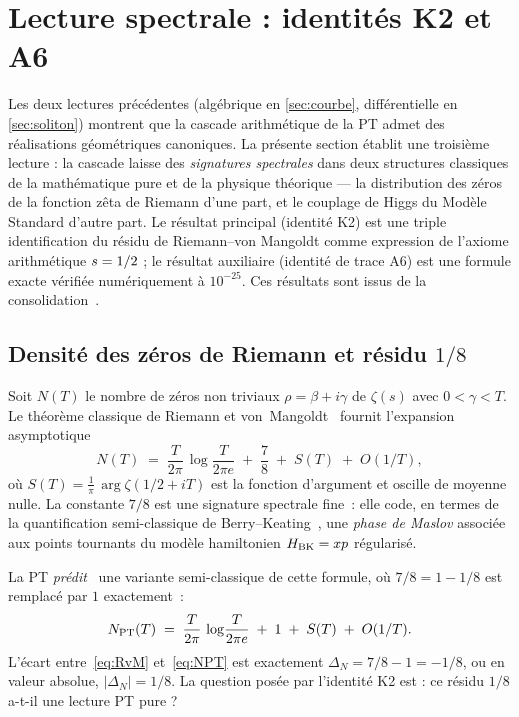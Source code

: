 \section{Lecture spectrale : identités K2 et A6}
\label{sec:spectrales}

Les deux lectures précédentes (algébrique en \ref{sec:courbe}, différentielle en \ref{sec:soliton}) montrent que la cascade arithmétique de la PT admet des réalisations géométriques canoniques. La présente section établit une troisième lecture : la cascade laisse des \emph{signatures spectrales} dans deux structures classiques de la mathématique pure et de la physique théorique --- la distribution des zéros de la fonction zêta de Riemann d'une part, et le couplage de Higgs du Modèle Standard d'autre part. Le résultat principal (identité K2) est une triple identification du résidu de Riemann--von Mangoldt comme expression de l'axiome arithmétique $s = 1/2$ ; le résultat auxiliaire (identité de trace A6) est une formule exacte vérifiée numériquement à $10^{-25}$. Ces résultats sont issus de la consolidation~\cite{PT_NewMath_Consolidation}.

\subsection{Densité des zéros de Riemann et résidu \texorpdfstring{$1/8$}{1/8}}
\label{sec:spectrales:RvM}

Soit $N(T)$ le nombre de zéros non triviaux $\rho = \beta + i\gamma$ de $\zeta(s)$ avec $0 < \gamma < T$. Le théorème classique de Riemann et von~Mangoldt~\cite{Edwards1974} fournit l'expansion asymptotique
\begin{equation}
N(T) \;=\; \dfrac{T}{2\pi}\,\log\!\dfrac{T}{2\pi e} \;+\; \dfrac{7}{8} \;+\; S(T) \;+\; O(1/T),
\label{eq:RvM}
\end{equation}
où $S(T) = \frac{1}{\pi}\,\arg \zeta(1/2 + iT)$ est la fonction d'argument et oscille de moyenne nulle. La constante $7/8$ est une signature spectrale fine~: elle code, en termes de la quantification semi-classique de Berry--Keating~\cite{BerryKeating1999}, une \emph{phase de Maslov} associée aux points tournants du modèle hamiltonien $H_{\rm BK} = xp$ régularisé.

La PT \emph{prédit}~\cite{PT_NewMath_Consolidation} une variante semi-classique de cette formule, où $7/8 = 1 - 1/8$ est remplacé par $1$ exactement~:
\begin{equation}
N_{\rm PT}(T) \;=\; \dfrac{T}{2\pi}\,\log\!\dfrac{T}{2\pi e} \;+\; 1 \;+\; S(T) \;+\; O(1/T).
\label{eq:NPT}
\end{equation}
L'écart entre~\eqref{eq:RvM} et~\eqref{eq:NPT} est exactement $\Delta_N = 7/8 - 1 = -1/8$, ou en valeur absolue, $|\Delta_N| = 1/8$. La question posée par l'identité K2 est : ce résidu $1/8$ a-t-il une lecture PT pure ?

